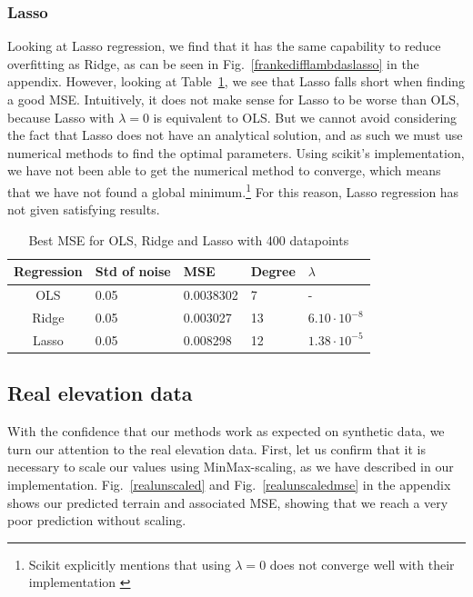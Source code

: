 \documentclass[twocolumn,10pt,cleanfoot]{asme2ej}
\begin{document}
\subsubsection{Lasso}

Looking at Lasso regression, we find that it has the same capability to reduce overfitting as Ridge, as can be seen in Fig.~\ref{frankedifflambdaslasso} in the appendix. However, looking at Table~\ref{ols_vs_ridge_vs_lasso_table}, we see that Lasso falls short when finding a good MSE. Intuitively, it does not make sense for Lasso to be worse than OLS, because Lasso with $\lambda = 0$ is equivalent to OLS. But we cannot avoid considering the fact that Lasso does not have an analytical solution, and as such we must use numerical methods to find the optimal parameters. Using scikit's implementation, we have not been able to get the numerical method to converge, which means that we have not found a global minimum.\footnote{Scikit explicitly mentions that using $\lambda = 0$ does not converge well with their implementation \cite{lasso}} For this reason, Lasso regression has not given satisfying results.


\begin{table}[t]
\caption{Best MSE for OLS, Ridge and Lasso with 400 datapoints}
\begin{center}
\label{ols_vs_ridge_vs_lasso_table}
\begin{tabular}{c | l l l l}
Regression & Std of noise & MSE & Degree & $\lambda$ \\
\hline
OLS & 0.05 & 0.0038302 & 7 & - \\
Ridge & 0.05 & 0.003027 & 13 & $6.10 \cdot 10^{-8}$ \\
Lasso & 0.05 & 0.008298 & 12 & $1.38 \cdot 10^{-5}$ \\
\hline
\end{tabular}
\end{center}
\end{table}


\subsection{Real elevation data}

With the confidence that our methods work as expected on synthetic data, we turn our attention to the real elevation data. First, let us confirm that it is necessary to scale our values using MinMax-scaling, as we have described in our implementation. Fig.~\ref{realunscaled} and Fig.~\ref{realunscaledmse} in the appendix shows our predicted terrain and associated MSE, showing that we reach a very poor prediction without scaling.
\end{document}

